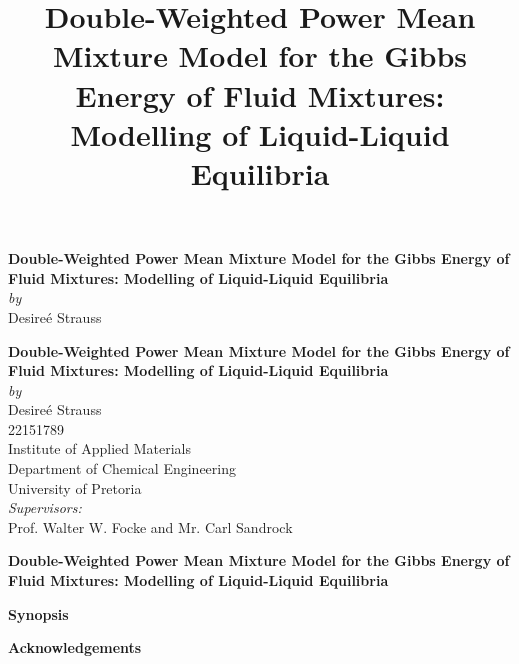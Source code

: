 \documentclass[a4paperm,bezier,amstex]{report}
\title{Double-Weighted Power Mean Mixture Model for the Gibbs Energy of Fluid Mixtures: Modelling of Liquid-Liquid Equilibria}
\author{}
\date{}
\numberwithin{equation}{section}
\numberwithin{figure}{section}
\begin{document}
\setlength{\parindent}{0pt}
\pagestyle{empty}
\renewcommand{\dateseparator}{-}
\begin{titlepage}
\vspace*{\fill}
\begin{center}
\begin{LARGE}
{\Huge \bfseries  Double-Weighted Power Mean Mixture Model for the Gibbs Energy of Fluid Mixtures: Modelling of Liquid-Liquid Equilibria}\\
\bigskip
\emph{by}\\
Desire\'{e} Strauss\\
\vspace*{\fill}
\end{LARGE}
\end{center}
\end{titlepage}

\begin{titlepage}
\begin{center}
\begin{LARGE}
{\Huge \bfseries  Double-Weighted Power Mean Mixture Model for the Gibbs Energy of Fluid Mixtures: Modelling of Liquid-Liquid Equilibria}\\
\bigskip
\emph{by}\\
Desire\'{e} Strauss\\
22151789\\
\bigskip
Institute of Applied Materials\\
Department of Chemical Engineering\\
University of Pretoria\\
\bigskip
\emph{Supervisors:}\\
Prof. Walter W. Focke and Mr. Carl Sandrock\\
\vfill
\end{LARGE}
\end{center}
\end{titlepage}
\cleardoublepage 
\pagestyle{plain}
\begin{center}
\begin{LARGE}
{\Huge \bfseries  Double-Weighted Power Mean Mixture Model for the Gibbs Energy of Fluid Mixtures: Modelling of Liquid-Liquid Equilibria}\\
\vspace*{30pt}
\end{LARGE}
\end{center}
{\Huge \bfseries Synopsis}
\vspace*{20pt}

\pagebreak
{\Huge \bfseries Acknowledgements}
\vspace*{20pt}

\pagebreak\
\setcounter{PageDummy}{\value{page}}
\end{document}
